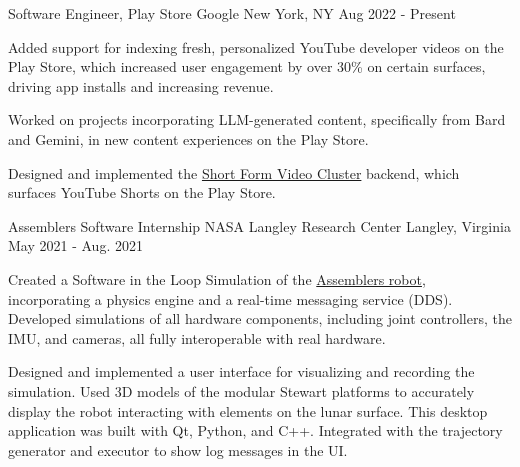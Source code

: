 

\begin{cventries}

  \cventry
  {Software Engineer, Play Store} %
  {Google} %
  {New York, NY} %
  {Aug 2022 - Present} %
  {
    \begin{cvitems} %
      \item {Added support for indexing fresh, personalized YouTube developer videos on the Play Store, which increased user engagement by over 30\% on certain surfaces, driving app installs and increasing revenue.}
      \item {Worked on projects incorporating LLM-generated content, specifically from Bard and Gemini, in new content experiences on the Play Store.}
      \item {Designed and implemented the \href{https://blog.google/products/google-play/google-play-report-games-apps}{Short Form Video Cluster} backend, which surfaces YouTube Shorts on the Play Store.}
    \end{cvitems}
  }

  \cventry
  {Assemblers Software Internship} %
  {NASA Langley Research Center} %
  {Langley, Virginia} %
  {May 2021 - Aug. 2021} %
  {
    \begin{cvitems} %
      \item {Created a Software in the Loop Simulation of the \href{https://youtu.be/_9Bncie6AmM}{Assemblers robot}, incorporating a physics engine and a real-time messaging service (DDS). Developed simulations of all hardware components, including joint controllers, the IMU, and cameras, all fully interoperable with real hardware.}
      \item {Designed and implemented a user interface for visualizing and recording the simulation. Used 3D models of the modular Stewart platforms to accurately display the robot interacting with elements on the lunar surface. This desktop application was built with Qt, Python, and C++. Integrated with the trajectory generator and executor to show log messages in the UI.}
    \end{cvitems}
  }


\end{cventries}
